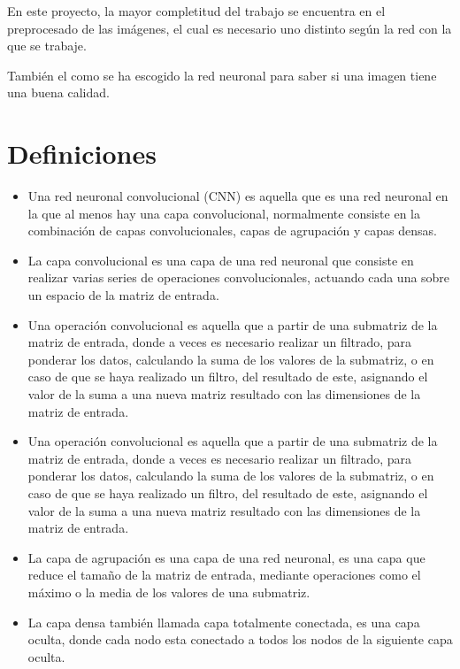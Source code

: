 
En este proyecto, la mayor completitud del trabajo se encuentra en el preprocesado de las imágenes, el cual es necesario uno distinto según la red con la que se trabaje.  

También el como se ha escogido la red neuronal para saber si una imagen tiene una buena calidad.
\section{Definiciones}
\begin{itemize}
    \item Una red neuronal convolucional (CNN) es aquella que es una red neuronal en la que al menos hay una capa convolucional, normalmente consiste en la combinación de capas convolucionales, capas de agrupación y capas densas. \cite{definicion_CNN}
    \item La capa convolucional es una capa de una red neuronal que consiste en realizar varias series de operaciones convolucionales, actuando cada una sobre un espacio de la matriz de entrada. \cite{definicionConvolucional_layer}
    \item Una operación convolucional es aquella que a partir de una submatriz de la matriz de entrada, donde a veces es necesario realizar un filtrado, para ponderar los datos, calculando la suma de los valores de la submatriz, o en caso de que se haya realizado un filtro, del resultado de este, asignando el valor de la suma a una nueva matriz resultado con las dimensiones de la matriz de entrada.\cite{definicionConvolutional_Operation}
    \item Una operación convolucional es aquella que a partir de una submatriz de la matriz de entrada, donde a veces es necesario realizar un filtrado, para ponderar los datos, calculando la suma de los valores de la submatriz, o en caso de que se haya realizado un filtro, del resultado de este, asignando el valor de la suma a una nueva matriz resultado con las dimensiones de la matriz de entrada.\cite{definicionConvolutional_Operation}
    \item La capa de agrupación es una capa de una red neuronal, es una capa que reduce el tamaño de la matriz de entrada, mediante operaciones como el máximo o la media de los valores de una submatriz.\cite{definicion_pooling}
    \item La capa densa también llamada capa totalmente conectada, es una capa oculta, donde cada nodo esta conectado a todos los nodos de la siguiente capa oculta.\cite{definicion_fully_connected_layer}

\end{itemize}



